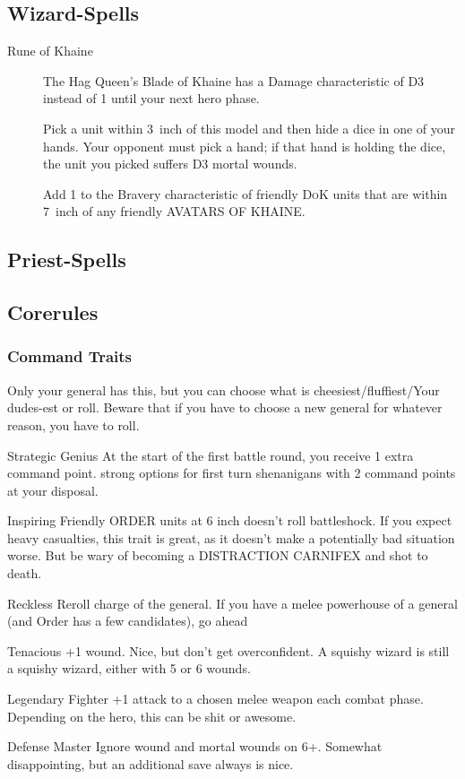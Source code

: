 \subsection{Wizard-Spells}
\begin{description}
    \item [Rune of Khaine] The Hag Queen's Blade of
      Khaine has a Damage characteristic of D3 instead of
      1 until your next hero phase.
  \item [] Pick a unit within
      3~inch of this model and then hide a dice in one of your hands.  Your
      opponent must pick a hand; if that hand is holding the dice, the unit you
      picked suffers D3 mortal wounds.
    \item [] Add 1 to the Bravery
        characteristic of friendly \textsc{DoK} units that are within 7~inch
        of any friendly AVATARS OF KHAINE.
\end{description}
\subsection{Priest-Spells}


\subsection{Corerules}
\subsubsection{Command Traits}
Only your general has this, but you can choose what is cheesiest/fluffiest/Your
dudes-est or roll. Beware that if you have to choose a new general for whatever
reason, you have to roll. 
\begin{description}
    \item{Strategic Genius} At the start of the first battle round, you
        receive 1 extra command point. strong options for first turn
        shenanigans with 2 command points at your disposal.
    \item{Inspiring} Friendly ORDER units at 6 inch doesn't roll battleshock. If
        you expect heavy casualties, this trait is great, as it doesn't make
        a potentially bad situation worse. But be wary of becoming
        a DISTRACTION CARNIFEX and shot to death.
    \item{Reckless} Reroll charge of the general. If you have a melee
        powerhouse of a general (and Order has a few candidates), go ahead
    \item{Tenacious} +1 wound. Nice, but don’t get overconfident. A squishy
        wizard is still a squishy wizard, either with 5 or 6 wounds.
    \item{Legendary Fighter} +1 attack to a chosen melee weapon each combat
        phase. Depending on the hero, this can be shit or awesome.
    \item{Defense Master} Ignore wound and mortal wounds on 6+. Somewhat
        disappointing, but an additional save always is nice.
\end{description}

